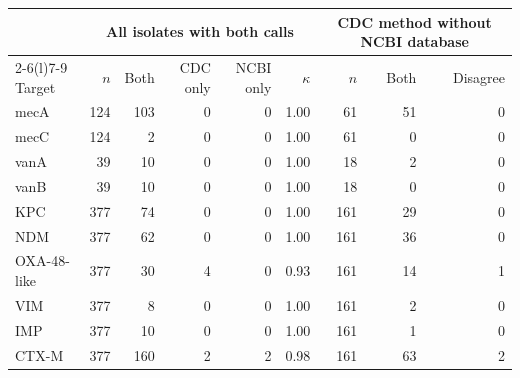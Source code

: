 \begin{tabular}{@{}lrrrrrrrr@{}}
\toprule
 & \multicolumn{5}{c}{All isolates with both calls} & \multicolumn{3}{c}{CDC method without NCBI database} \\
\cmidrule(lr){2-6}\cmidrule(l){7-9}
Target & $n$ & Both & CDC only & NCBI only & $\kappa$ & $n$ & Both & Disagree \\
\midrule
mecA & 124 & 103 & 0 & 0 & 1.00 & 61 & 51 & 0 \\
mecC & 124 & 2 & 0 & 0 & 1.00 & 61 & 0 & 0 \\
vanA & 39 & 10 & 0 & 0 & 1.00 & 18 & 2 & 0 \\
vanB & 39 & 10 & 0 & 0 & 1.00 & 18 & 0 & 0 \\
KPC & 377 & 74 & 0 & 0 & 1.00 & 161 & 29 & 0 \\
NDM & 377 & 62 & 0 & 0 & 1.00 & 161 & 36 & 0 \\
OXA-48-like & 377 & 30 & 4 & 0 & 0.93 & 161 & 14 & 1 \\
VIM & 377 & 8 & 0 & 0 & 1.00 & 161 & 2 & 0 \\
IMP & 377 & 10 & 0 & 0 & 1.00 & 161 & 1 & 0 \\
CTX-M & 377 & 160 & 2 & 2 & 0.98 & 161 & 63 & 2 \\
\bottomrule
\end{tabular}
